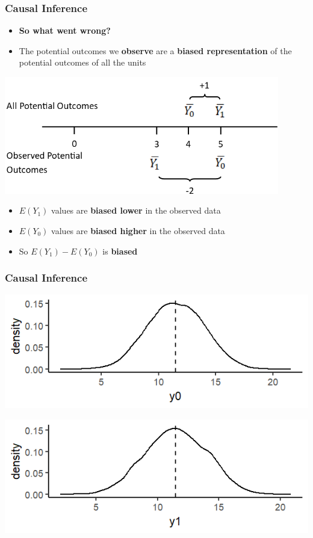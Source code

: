 \documentclass[xcolor=x11names,compress]{beamer}\usepackage[]{graphicx}\usepackage[]{color}
\makeatletter
\def\maxwidth{ %
  \ifdim\Gin@nat@width>\linewidth
    \linewidth
  \else
    \Gin@nat@width
  \fi
}
\newenvironment{knitrout}{}{} %
\renewcommand{\(}{\begin{columns}}
\renewcommand{\)}{\end{columns}}
\newcommand{\<}[1]{\begin{column}{#1}}
\renewcommand{\>}{\end{column}}
\makeatother
\begin{document}
\begin{frame}
\frametitle{Causal Inference}
\begin{itemize}
\item \textbf{So what went wrong?}
\item The potential outcomes we \textbf{observe} are a \textbf{biased representation} of the potential outcomes of all the units
\end{itemize}
\includegraphics[width=0.9\textwidth]{PO_number_line_2.png}
\begin{itemize}
\item $E(Y_1)$ values are \textbf{biased lower} in the observed data
\pause
\item $E(Y_0)$ values are \textbf{biased higher} in the observed data
\pause
\item So $E(Y_1)-E(Y_0)$ is \textbf{biased}
\end{itemize}
\end{frame}

\begin{frame}
\frametitle{Causal Inference}
\begin{knitrout}
\color{fgcolor}
\includegraphics[width=\maxwidth]{figure/OVB1a-1} 

\end{knitrout}
\pause
\begin{knitrout}
\color{fgcolor}
\includegraphics[width=\maxwidth]{figure/OVB2a-1} 

\end{knitrout}
\end{frame}
\end{document}
